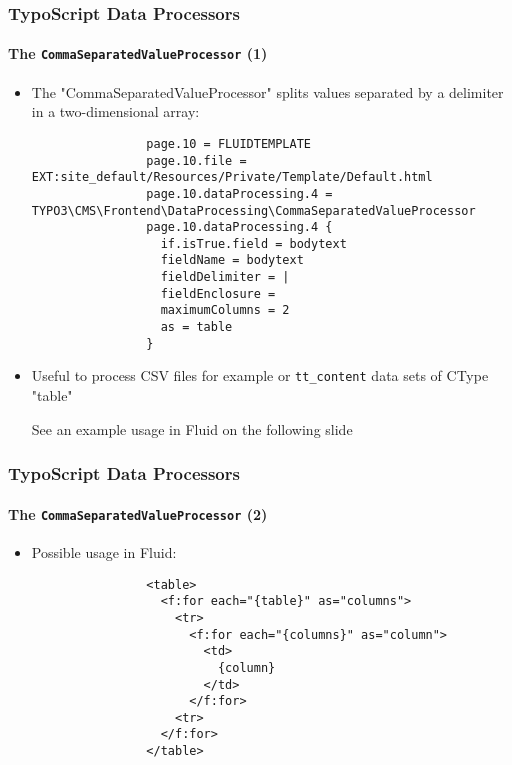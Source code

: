 \begin{frame}[fragile]
	\frametitle{TypoScript Data Processors}
	\framesubtitle{The \texttt{CommaSeparatedValueProcessor} (1)}

	\lstset{basicstyle=\tiny\ttfamily}

	\begin{itemize}

		\item The "CommaSeparatedValueProcessor" splits values separated by a delimiter in a two-dimensional array:

			\begin{lstlisting}
				page.10 = FLUIDTEMPLATE
				page.10.file = EXT:site_default/Resources/Private/Template/Default.html
				page.10.dataProcessing.4 = TYPO3\CMS\Frontend\DataProcessing\CommaSeparatedValueProcessor
				page.10.dataProcessing.4 {
				  if.isTrue.field = bodytext
				  fieldName = bodytext
				  fieldDelimiter = |
				  fieldEnclosure =
				  maximumColumns = 2
				  as = table
				}
			\end{lstlisting}

		\item Useful to process CSV files for example or \texttt{tt\_content} data sets of CType "table"

			\vspace{0.2cm}
			\small
				See an example usage in Fluid on the following slide
			\normalsize

	\end{itemize}

\end{frame}


\begin{frame}[fragile]
	\frametitle{TypoScript Data Processors}
	\framesubtitle{The \texttt{CommaSeparatedValueProcessor} (2)}

	\lstset{basicstyle=\tiny\ttfamily}

	\begin{itemize}

		\item Possible usage in Fluid:

			\begin{lstlisting}
				<table>
				  <f:for each="{table}" as="columns">
				    <tr>
				      <f:for each="{columns}" as="column">
				        <td>
				          {column}
				        </td>
				      </f:for>
				    <tr>
				  </f:for>
				</table>
			\end{lstlisting}

	\end{itemize}

\end{frame}

